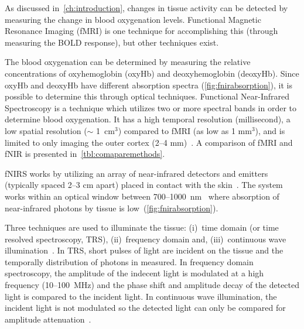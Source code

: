As discussed in~\cref{ch:introduction}, changes in tissue activity can be detected by measuring the change in blood oxygenation levels.  Functional Magnetic Resonance Imaging (fMRI) is one technique for accomplishing this (through measuring the BOLD response), but other techniques exist.  

The blood oxygenation can be determined by measuring the relative concentrations of oxyhemoglobin (oxyHb) and deoxyhemoglobin (deoxyHb).  Since oxyHb and deoxyHb have different absorption spectra (\cref{fig:fnirabsorption}), it is possible to determine this through optical techniques.  Functional Near-Infrared Spectroscopy is a technique which utilizes two or more spectral bands in order to determine blood oxygenation.  It has a high temporal resolution (millisecond), a low spatial resolution ($\sim$ 1~cm$^3$) compared to fMRI (as low as 1 mm$^3$), and is limited to only imaging the outer cortex (2--4 mm)~\citep{bunce2006}. A comparison of fMRI and fNIR is presented in~\cref{tbl:comaparemethods}.

fNIRS works by utilizing an array of near-infrared detectors and emitters (typically spaced 2--3 cm apart) placed in contact with the skin~\citep{villringer1997,izzetoglu2004}.  The system works within an optical window between 700--1000~nm~\citep{villringer1997} where absorption of near-infrared photons by tissue is low~(\cref{fig:fnirabsorption}).

% 
% 

Three techniques are used to illuminate the tissue: (i)~time domain (or time resolved spectroscopy, TRS), (ii)~frequency domain and, (iii)~continuous wave illumination~\citep{izzetoglu2004}.  In TRS, short pulses of light are incident on the tissue and the temporally distribution of photons in measured.  In frequency domain spectroscopy, the amplitude of the indecent light is modulated at a high frequency (10--100~MHz) and the phase shift and amplitude decay of the detected light is compared to the incident light. In continuous wave illumination, the incident light is not modulated so the detected light can only be compared for amplitude attenuation~\citep{izzetoglu2004}.

